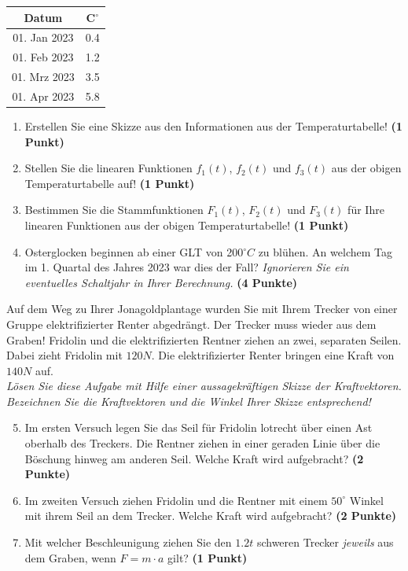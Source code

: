 \documentclass[a4paper, 9pt]{scrartcl}\usepackage[]{graphicx}\usepackage[]{xcolor}
\begin{document}
\begin{center}
\begin{tabular}{cc}
  \toprule
  Datum & C$^\circ$ \\
  \midrule
  01. Jan 2023 & 0.4\\
  01. Feb 2023 & 1.2\\
  01. Mrz 2023 & 3.5\\
  01. Apr 2023 & 5.8\\
  \bottomrule
\end{tabular}
\end{center}

\begin{enumerate}
\item Erstellen Sie eine Skizze aus den Informationen aus der
  Temperaturtabelle!  \textbf{(1 Punkt)}
\item Stellen Sie die linearen Funktionen $f_1(t)$, $f_2(t)$ und
  $f_3(t)$ aus der obigen Temperaturtabelle auf!  \textbf{(1 Punkt)}
\item Bestimmen Sie die Stammfunktionen $F_1(t)$, $F_2(t)$ und $F_3(t)$ f{\"u}r
  Ihre linearen Funktionen aus der obigen Temperaturtabelle!  \textbf{(1
    Punkt)}
\item Osterglocken beginnen ab einer GLT von 200$^\circ C$ zu bl{\"u}hen. An
  welchem Tag im 1. Quartal des Jahres 2023 war dies der
  Fall? \textit{Ignorieren Sie ein eventuelles Schaltjahr in Ihrer Berechnung.} \textbf{(4 Punkte)}
\end{enumerate}

Auf dem Weg zu Ihrer Jonagoldplantage wurden Sie mit Ihrem Trecker von
einer Gruppe elektrifizierter Renter abgedr{\"a}ngt. Der Trecker muss wieder
aus dem Graben! Fridolin und die elektrifizierten Rentner ziehen an zwei,
separaten Seilen. Dabei zieht Fridolin mit $120N$. Die
elektrifizierter Renter  bringen eine Kraft von $140N$ auf.\\

\textit{L{\"o}sen Sie diese Aufgabe mit Hilfe einer aussagekr{\"a}ftigen Skizze der
  Kraftvektoren. Bezeichnen Sie die Kraftvektoren und die Winkel Ihrer
  Skizze entsprechend!}

\begin{enumerate}
  \setcounter{enumi}{4}  
\item Im ersten Versuch legen Sie das Seil f{\"u}r Fridolin lotrecht {\"u}ber einen
  Ast oberhalb des Treckers. Die Rentner ziehen in einer geraden Linie {\"u}ber
  die B{\"o}schung hinweg am anderen Seil. Welche Kraft wird aufgebracht?
  \textbf{(2 Punkte)}
\item Im zweiten Versuch ziehen Fridolin und die Rentner mit einem
  $50^\circ$ Winkel mit ihrem Seil an dem Trecker. Welche Kraft
  wird aufgebracht? \textbf{(2 Punkte)}
\item Mit welcher Beschleunigung ziehen Sie den $1.2t$ schweren
  Trecker \textit{jeweils} aus dem Graben, wenn $F = m \cdot a$ gilt?
  \textbf{(1 Punkt)}
\end{enumerate}
\end{document}
